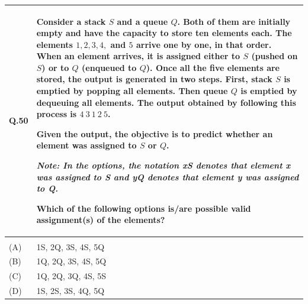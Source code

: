 \documentclass[14pt]{article}
\begin{document}
\vspace{0.3cm}

\begin{tabular}{|p{1.5cm}|p{12cm}|}
\hline
Q.50 &
\parbox[t]{\linewidth}{
Consider a stack $S$ and a queue $Q$. Both of them are initially empty and have the capacity to store ten elements each. The elements $1,2,3,4,$ and $5$ arrive one by one, in that order. When an element arrives, it is assigned either to $S$ (pushed on $S$) or to $Q$ (enqueued to $Q$). Once all the five elements are stored, the output is generated in two steps. First, stack $S$ is emptied by popping all elements. Then queue $Q$ is emptied by dequeuing all elements. The output obtained by following this process is $4\ 3\ 1\ 2\ 5$.

\vspace{0.2cm}

Given the output, the objective is to predict whether an element was assigned to $S$ or $Q$.

\vspace{0.2cm}

\textit{Note: In the options, the notation xS denotes that element x was assigned to S and yQ denotes that element y was assigned to Q.}

\vspace{0.2cm}

Which of the following options is/are possible valid assignment(s) of the elements?
}

\rule{0pt}{0.8cm}

\\
\hline
& \\
\hline
(A) & 1S, 2Q, 3S, 4S, 5Q \\
\hline
(B) & 1Q, 2Q, 3S, 4S, 5Q \\
\hline
(C) & 1Q, 2Q, 3Q, 4S, 5S \\
\hline
(D) & 1S, 2S, 3S, 4Q, 5Q \\
\hline
\end{tabular}

\vspace{0.3cm}
\end{document}
